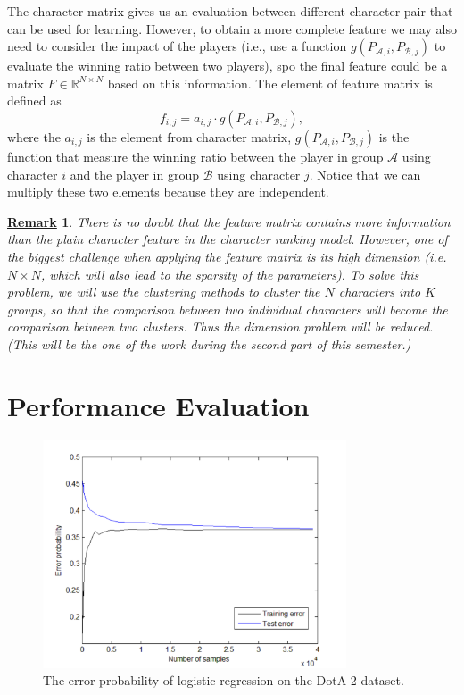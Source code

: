\documentclass{article} %
\newtheorem{remark}{\underline{Remark}}
\begin{document}
The character matrix gives us an evaluation between different character pair that can be used for learning. However, to obtain a more complete feature we may also need to consider the impact of the players (i.e., use a function $g(P_{\mathcal{A},i},P_{\mathcal{B},j})$ to evaluate the winning ratio between two players), spo the final feature could be a matrix $F \in \mathbb{R}^{N\times N}$ based on this information. The element of feature matrix is defined as
\begin{equation}
f_{i,j}=a_{i,j} \cdot g(P_{\mathcal{A},i},P_{\mathcal{B},j}),
\end{equation}
where the $a_{i,j}$ is the element from character matrix, $g(P_{\mathcal{A},i},P_{\mathcal{B},j})$ is the function that measure the winning ratio between the player in group $\mathcal{A}$ using character $i$ and the player in group $\mathcal{B}$ using character $j$. Notice that we can multiply these two elements because they are independent.

\begin{remark}
There is no doubt that the feature matrix contains more information than the plain character feature in the character ranking model. However, one of the biggest challenge when applying the feature matrix is its high dimension (i.e. $N\times N$, which will also lead to the sparsity of the parameters). To solve this problem, we will use the clustering methods to cluster the $N$ characters into $K$ groups, so that the comparison between two individual characters will become the comparison between two clusters. Thus the dimension problem will be reduced. (This will be the one of the work during the second part of this semester.)
\end{remark}



\section{Performance Evaluation}



\begin{figure}[t]
  \centering
    \includegraphics[width=90mm]{dota2_logreg_error.pdf}
  \caption{The error probability of logistic regression on the DotA 2 dataset.}
  \label{fig:dota2_log}
\end{figure}
\end{document}
